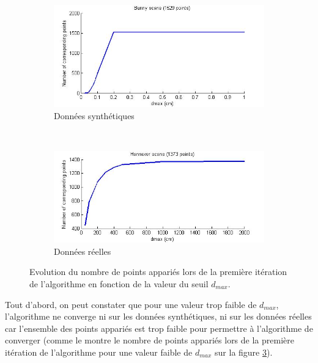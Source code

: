 \begin{figure}[!h]
   \centering
   \begin{subfigure}[t]{.5\linewidth}
     \centering
     \includegraphics[scale=0.4]{Images/Resultats/bunny_size_subset_dmax.jpg}
     \caption{Données synthétiques}
     \label{fig:subset_dmax_synthe}
   \end{subfigure}%
   ~
   \begin{subfigure}[t]{.5\linewidth}
     \centering
     \includegraphics[scale=0.4]{Images/Resultats/hannover_size_subset_dmax.jpg}
     \caption{Données réelles}
     \label{fig:subset_dmax_reelle}
   \end{subfigure}
   
   \caption{Evolution du nombre de points appariés lors de la première itération de l'algorithme en fonction de la valeur du seuil $d_{max}$.}
   \label{fig:subset_dmax}
\end{figure}

Tout d'abord, on peut constater que pour une valeur trop faible de $d_{max}$, l'algorithme ne converge ni sur les données synthétiques, ni sur les données réelles car l'ensemble des points appariés est trop faible pour permettre à l'algorithme de converger (comme le montre le nombre de points appariés lors de la première itération de l'algorithme pour une valeur faible de $d_{max}$ sur la figure \ref{fig:subset_dmax}).

